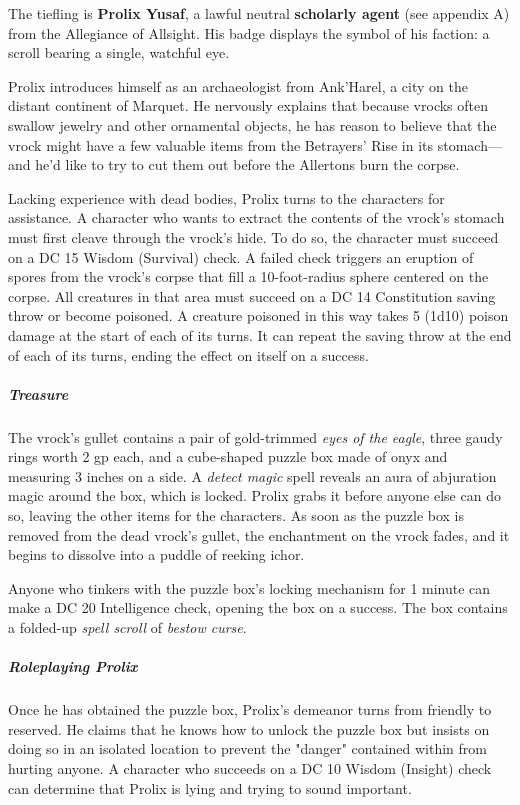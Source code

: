 \documentclass[10pt,a4paper,twoside,bg=print,twocolumn,openany,nodeprecatedcode]{dndbook}
\begin{document}
The tiefling is \textbf{Prolix Yusaf}, a lawful neutral \textbf{scholarly agent} (see appendix A) from the Allegiance of Allsight. His badge displays the symbol of his faction: a scroll bearing a single, watchful eye.

Prolix introduces himself as an archaeologist from Ank'Harel, a city on the distant continent of Marquet. He nervously explains that because vrocks often swallow jewelry and other ornamental objects, he has reason to believe that the vrock might have a few valuable items from the Betrayers' Rise in its stomach—and he'd like to try to cut them out before the Allertons burn the corpse.

Lacking experience with dead bodies, Prolix turns to the characters for assistance. A character who wants to extract the contents of the vrock's stomach must first cleave through the vrock's hide. To do so, the character must succeed on a DC 15 Wisdom (Survival) check. A failed check triggers an eruption of spores from the vrock's corpse that fill a 10-foot-radius sphere centered on the corpse. All creatures in that area must succeed on a DC 14 Constitution saving throw or become poisoned. A creature poisoned in this way takes 5 (1d10) poison damage at the start of each of its turns. It can repeat the saving throw at the end of each of its turns, ending the effect on itself on a success.

\subparagraph{Treasure}
The vrock's gullet contains a pair of gold-trimmed \textit{eyes of the eagle}, three gaudy rings worth 2 gp each, and a cube-shaped puzzle box made of onyx and measuring 3 inches on a side. A \textit{detect magic} spell reveals an aura of abjuration magic around the box, which is locked. Prolix grabs it before anyone else can do so, leaving the other items for the characters. As soon as the puzzle box is removed from the dead vrock's gullet, the enchantment on the vrock fades, and it begins to dissolve into a puddle of reeking ichor.

Anyone who tinkers with the puzzle box's locking mechanism for 1 minute can make a DC 20 Intelligence check, opening the box on a success. The box contains a folded-up \textit{spell scroll} of \textit{bestow curse}.

\subparagraph{Roleplaying Prolix}
Once he has obtained the puzzle box, Prolix's demeanor turns from friendly to reserved. He claims that he knows how to unlock the puzzle box but insists on doing so in an isolated location to prevent the "danger" contained within from hurting anyone. A character who succeeds on a DC 10 Wisdom (Insight) check can determine that Prolix is lying and trying to sound important.
\end{document}
